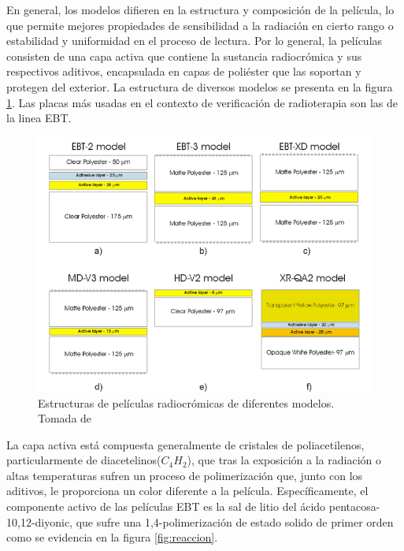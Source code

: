 En general, los modelos difieren en la estructura y composición de la película, lo que permite mejores propiedades de sensibilidad a la radiación en cierto rango o estabilidad y uniformidad en el proceso de lectura. Por lo general, la películas consisten de una capa activa que contiene la sustancia radiocrómica y sus respectivos aditivos, encapsulada en capas de poliéster que las soportan y protegen del exterior. La estructura de diversos modelos se presenta en la figura \ref{fig:Estructuras}. Las placas más usadas en el contexto de verificación de radioterapia son las de la linea EBT.\\
\begin{figure}[H]
	\centering
	\includegraphics[width=\linewidth]{images/modelos.png}
	\caption{Estructuras de películas radiocrómicas de diferentes modelos. Tomada de \cite{Devic2016}}
	\label{fig:Estructuras}
\end{figure}

La capa activa está compuesta generalmente de cristales de poliacetilenos\cite{Williams2011}, particularmente de diacetelinos($C_4H_2$), que tras la exposición a la radiación o altas temperaturas sufren un proceso de polimerización que, junto con los aditivos, le proporciona un color diferente a la película. Específicamente, el componente activo de las películas EBT es la sal de litio del ácido pentacosa-10,12-diyonic, que sufre una 1,4-polimerización de estado solido de primer orden como se evidencia en la figura \ref{fig:reaccion}.\\  

